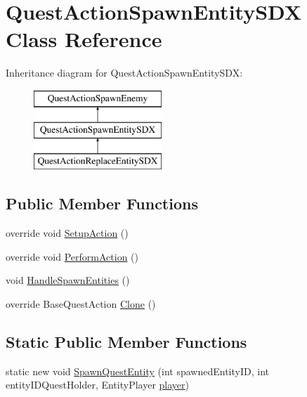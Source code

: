 \hypertarget{class_quest_action_spawn_entity_s_d_x}{}\section{Quest\+Action\+Spawn\+Entity\+S\+DX Class Reference}
\label{class_quest_action_spawn_entity_s_d_x}
Inheritance diagram for Quest\+Action\+Spawn\+Entity\+S\+DX\+:\begin{figure}[H]
\begin{center}
\leavevmode
\includegraphics[height=3.000000cm]{d9/db1/class_quest_action_spawn_entity_s_d_x}
\end{center}
\end{figure}
\subsection*{Public Member Functions}
\begin{DoxyCompactItemize}
\item 
override void \mbox{\hyperlink{class_quest_action_spawn_entity_s_d_x_a6902fc3d884ca3eb9a19566a1db9ca6e}{Setup\+Action}} ()
\item 
override void \mbox{\hyperlink{class_quest_action_spawn_entity_s_d_x_a06bb80d9e1e195fec2597394731df71f}{Perform\+Action}} ()
\item 
void \mbox{\hyperlink{class_quest_action_spawn_entity_s_d_x_af16565ac6f58bf902a6b0168b903a48d}{Handle\+Spawn\+Entities}} ()
\item 
override Base\+Quest\+Action \mbox{\hyperlink{class_quest_action_spawn_entity_s_d_x_a6570686aa37e4c410fd434769dae7753}{Clone}} ()
\end{DoxyCompactItemize}
\subsection*{Static Public Member Functions}
\begin{DoxyCompactItemize}
\item 
static new void \mbox{\hyperlink{class_quest_action_spawn_entity_s_d_x_a2957c925945eab011f79267d9dfe739f}{Spawn\+Quest\+Entity}} (int spawned\+Entity\+ID, int entity\+I\+D\+Quest\+Holder, Entity\+Player \mbox{\hyperlink{_sphere_i_i_01_music_01_boxes_2_config_2_localization_8txt_a4e2cb8aeff651600ea1cc57fe5a929a4}{player}})
\end{DoxyCompactItemize}


